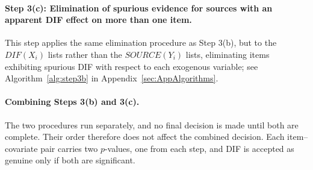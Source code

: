 \documentclass[12pt]{article}
\theoremstyle{examplestyle}
\begin{document}
\paragraph{Step 3(c): Elimination of spurious evidence for sources with an apparent
DIF effect on more than one item.} This step applies the same elimination procedure as Step 3(b), but to the $DIF(X_i)$ lists rather than the $SOURCE(Y_i)$ lists, eliminating items exhibiting spurious DIF with respect to each exogenous variable; see Algorithm~\ref{alg:step3b} in Appendix~\ref{sec:AppAlgorithms}.

\paragraph{Combining Steps 3(b) and 3(c).} The two procedures run separately, and no final decision is made until both are complete. Their order therefore does not affect the combined decision. Each item--covariate pair carries two $p$-values, one from each step, and DIF is accepted as genuine only if both are significant.
\end{document}
